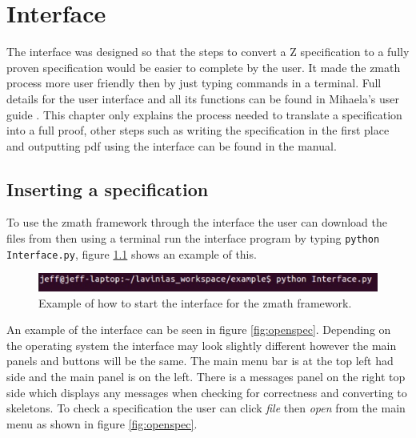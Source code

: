 \chapter{Interface}
\label{ch:interface}

The interface was designed so that the steps to convert a Z specification to a fully proven specification would be easier to complete by the user. It made the \gls{zmath} process more user friendly then by just typing commands in a terminal. Full details for the user interface and all its functions can be found in Mihaela's user guide \cite{zmathuser}. This chapter only explains the process needed to translate a specification into a full proof, other steps such as writing the specification in the first place and outputting pdf using the interface can be found in the manual.

\section{Inserting a specification}
To use the \gls{zmath} framework through the interface the user can download the files from \cite{zmathweb} then using a terminal run the interface program by typing \newline \verb|python Interface.py|, figure \ref{fig:startinterface} shows an example of this.

\begin{figure}[H]
\includegraphics[scale=0.6]{Figures/Interface/startinterface.png}
\caption{Example of how to start the interface for the \gls{zmath} framework. \label{fig:startinterface}}
\end{figure}

An example of the interface can be seen in figure \ref{fig:openspec}. Depending on the operating system the interface may look slightly different however the main panels and buttons will be the same. The main menu bar is at the top left had side and the main panel is on the left. There is a messages panel on the right top side which displays any messages when checking for correctness and converting to skeletons. To check a specification the user can click \emph{file} then \emph{open} from the main menu as shown in figure \ref{fig:openspec}.

